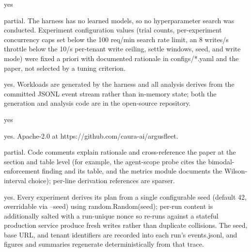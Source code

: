 \documentclass[letterpaper]{article}
\begin{document}
\begin{itemize}

yes

\begin{itemize}

    partial. The harness has no learned models, so no hyperparameter search was conducted. Experiment configuration values (trial counts, per-experiment concurrency caps set below the 100 req/min search rate limit, an 8 writes/s throttle below the 10/s per-tenant write ceiling, settle windows, seed, and write mode) were fixed a priori with documented rationale in configs/*.yaml and the paper, not selected by a tuning criterion.

    yes. Workloads are generated by the harness and all analysis derives from the committed JSONL event stream rather than in-memory state; both the generation and analysis code are in the open-source repository.

    yes

    yes. Apache-2.0 at https://github.com/caura-ai/argusfleet.

    partial. Code comments explain rationale and cross-reference the paper at the section and table level (for example, the agent-scope probe cites the bimodal-enforcement finding and its table, and the metrics module documents the Wilson-interval choice); per-line derivation references are sparser.

    yes. Every experiment derives its plan from a single configurable seed (default 42, overridable via --seed) using random.Random(seed); per-run content is additionally salted with a run-unique nonce so re-runs against a stateful production service produce fresh writes rather than duplicate collisions. The seed, base URL, and tenant identifiers are recorded into each run's events.jsonl, and figures and summaries regenerate deterministically from that trace.


\end{itemize}
\end{itemize}
\end{document}
